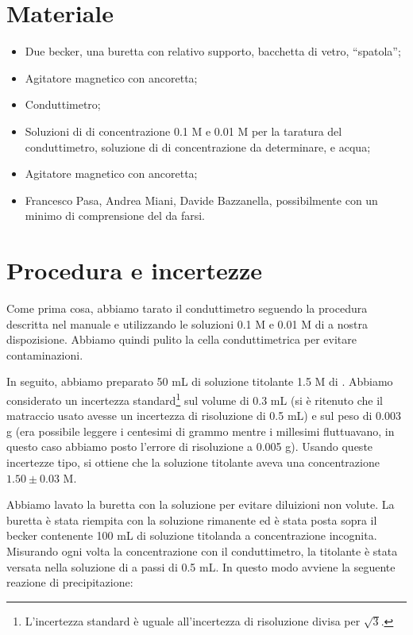 \section*{Materiale}

\begin{itemize}
        \setlength{\parskip}{-1pt}
        \item{Due becker, una buretta con relativo supporto, bacchetta di vetro, ``spatola'';}
        \item{Agitatore magnetico con ancoretta;}
        \item{Conduttimetro;}
        \item{Soluzioni di  di concentrazione 0.1 M e 0.01 M per la taratura del conduttimetro,
                soluzione di  di concentrazione da determinare,  e acqua;}
        \item{Agitatore magnetico con ancoretta;}
        \item{Francesco Pasa, Andrea Miani, Davide Bazzanella, possibilmente con un minimo di comprensione
                del da farsi.}
\end{itemize}

\section*{Procedura e incertezze}

Come prima cosa, abbiamo tarato il conduttimetro seguendo la procedura descritta nel manuale e utilizzando
le soluzioni 0.1 M e 0.01 M di  a nostra dispozisione. Abbiamo quindi pulito la cella conduttimetrica per evitare contaminazioni.

In seguito, abbiamo preparato 50 mL di soluzione titolante 1.5 M di . Abbiamo considerato un
incertezza standard\footnote{L'incertezza standard è uguale all'incertezza di risoluzione divisa per $\sqrt{3}$.} sul volume di 0.3 mL 
(si è ritenuto che il matraccio usato avesse un incertezza di risoluzione di 0.5 mL)
e sul peso di 0.003 g (era possibile leggere i centesimi di grammo mentre i millesimi fluttuavano, in questo caso abbiamo posto l'errore di risoluzione a 0.005 g).
Usando queste incertezze tipo, si ottiene che la soluzione titolante aveva una concentrazione $1.50 \pm 0.03$ M.

Abbiamo lavato la buretta con la soluzione per evitare diluizioni non volute. La buretta è stata riempita con
la soluzione rimanente ed è stata posta sopra il becker contenente 100 mL di soluzione titolanda a concentrazione incognita.
Misurando ogni volta la concentrazione con il conduttimetro, la titolante è stata versata nella soluzione di 
a passi di 0.5 mL. In questo modo avviene la seguente reazione di precipitazione:

